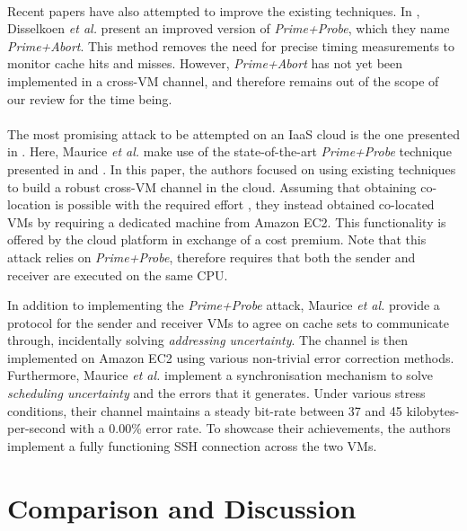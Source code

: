 \documentclass[orivec,envcountsame, a4paper, 11pt]{llncs}
\begin{document}
\paragraph{} Recent papers have also attempted to improve the existing techniques. In \cite{Disselkoen2017}, Disselkoen \textit{et al.} present an improved version of \textit{Prime+Probe}, which they name \textit{Prime+Abort}. This method removes the need for precise timing measurements to monitor cache hits and misses. However, \textit{Prime+Abort} has not yet been implemented in a cross-VM channel, and therefore remains out of the scope of our review for the time being.

\paragraph{} The most promising attack to be attempted on an IaaS cloud is the one presented in \cite{Maurice2017}. Here, Maurice \textit{et al.} \cite{Maurice2017} make use of the state-of-the-art \textit{Prime+Probe} technique presented in \cite{Irazoqui2015} and \cite{Liu2015}. In this paper, the authors focused on using existing techniques to build a robust cross-VM channel in the cloud. Assuming that obtaining co-location is possible with the required effort \cite{Ristenpart2009,Varadarajan2015,Xu2015}, they instead obtained co-located VMs by requiring a dedicated machine from Amazon EC2. This functionality is offered by the cloud platform in exchange of a cost premium. Note that this attack relies on \textit{Prime+Probe}, therefore requires that both the sender and receiver are executed on the same CPU.

In addition to implementing the \textit{Prime+Probe} attack, Maurice \textit{et al.} \cite{Maurice2017} provide a protocol for the sender and receiver VMs to agree on cache sets to communicate through, incidentally solving \textit{addressing uncertainty}. The channel is then implemented on Amazon EC2 using various non-trivial error correction methods. Furthermore, Maurice \textit{et al.} \cite{Maurice2017} implement a synchronisation mechanism to solve \textit{scheduling uncertainty} and the errors that it generates. Under various stress conditions, their channel maintains a steady bit-rate between 37 and 45 kilobytes-per-second with a 0.00\% error rate. To showcase their achievements, the authors implement a fully functioning SSH connection across the two VMs.

\section{Comparison and Discussion}
\label{sec:discussion}
\end{document}
